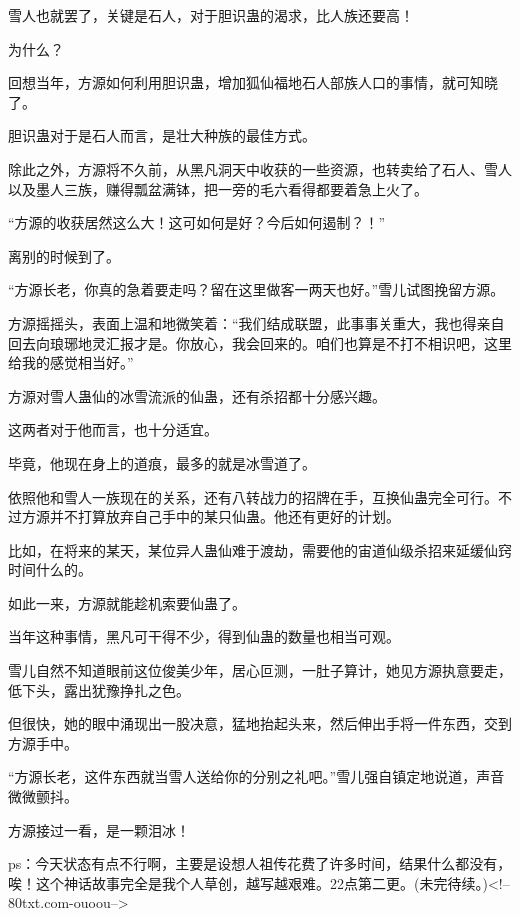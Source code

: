 \begin{this_body}
雪人也就罢了，关键是石人，对于胆识蛊的渴求，比人族还要高！

为什么？

回想当年，方源如何利用胆识蛊，增加狐仙福地石人部族人口的事情，就可知晓了。

胆识蛊对于是石人而言，是壮大种族的最佳方式。

除此之外，方源将不久前，从黑凡洞天中收获的一些资源，也转卖给了石人、雪人以及墨人三族，赚得瓢盆满钵，把一旁的毛六看得都要着急上火了。

“方源的收获居然这么大！这可如何是好？今后如何遏制？！”

离别的时候到了。

“方源长老，你真的急着要走吗？留在这里做客一两天也好。”雪儿试图挽留方源。

方源摇摇头，表面上温和地微笑着：“我们结成联盟，此事事关重大，我也得亲自回去向琅琊地灵汇报才是。你放心，我会回来的。咱们也算是不打不相识吧，这里给我的感觉相当好。”

方源对雪人蛊仙的冰雪流派的仙蛊，还有杀招都十分感兴趣。

这两者对于他而言，也十分适宜。

毕竟，他现在身上的道痕，最多的就是冰雪道了。

依照他和雪人一族现在的关系，还有八转战力的招牌在手，互换仙蛊完全可行。不过方源并不打算放弃自己手中的某只仙蛊。他还有更好的计划。

比如，在将来的某天，某位异人蛊仙难于渡劫，需要他的宙道仙级杀招来延缓仙窍时间什么的。

如此一来，方源就能趁机索要仙蛊了。

当年这种事情，黑凡可干得不少，得到仙蛊的数量也相当可观。

雪儿自然不知道眼前这位俊美少年，居心叵测，一肚子算计，她见方源执意要走，低下头，露出犹豫挣扎之色。

但很快，她的眼中涌现出一股决意，猛地抬起头来，然后伸出手将一件东西，交到方源手中。

“方源长老，这件东西就当雪人送给你的分别之礼吧。”雪儿强自镇定地说道，声音微微颤抖。

方源接过一看，是一颗泪冰！

ps：今天状态有点不行啊，主要是设想人祖传花费了许多时间，结果什么都没有，唉！这个神话故事完全是我个人草创，越写越艰难。22点第二更。(未完待续。)<!--80txt.com-ouoou-->

\end{this_body}

